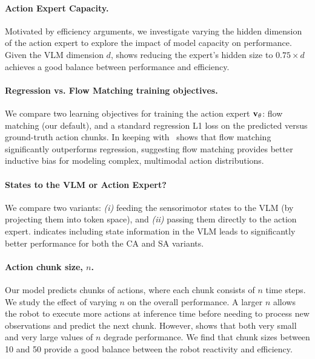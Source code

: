 \paragraph{Action Expert Capacity.}
Motivated by efficiency arguments, we investigate varying the hidden dimension of the action expert to explore the impact of model capacity on performance.
Given the VLM dimension \( d \),  shows reducing the expert's hidden size to \( 0.75 \times d \) achieves a good balance between performance and efficiency.



\paragraph{Regression vs. Flow Matching training objectives.}
We compare two learning objectives for training the action expert \( \mathbf{v}_\theta \): flow matching (our default), and a standard regression L1 loss on the predicted versus ground-truth action chunks. 
In keeping with~\citet{black2024pi_0, chi2024diffusionpolicy}  shows that flow matching significantly outperforms regression, suggesting flow matching provides better inductive bias for modeling complex, multimodal action distributions.

\paragraph{States to the VLM or Action Expert?}
We compare two variants: \emph{(i)} feeding the sensorimotor states to the VLM (by projecting them into token space), and \emph{(ii)} passing them directly to the action expert. 
 indicates including state information in the VLM leads to significantly better performance for both the CA and SA variants.



\paragraph{Action chunk size, \( n \).}
Our model predicts chunks of actions, where each chunk consists of \( n \) time steps. We study the effect of varying \( n \) on the overall performance. 
A larger \( n \) allows the robot to execute more actions at inference time before needing to process new observations and predict the next chunk. 
However,  shows that both very small and very large values of \( n \) degrade performance. We find that chunk sizes between 10 and 50 provide a good balance between the robot reactivity and efficiency.

